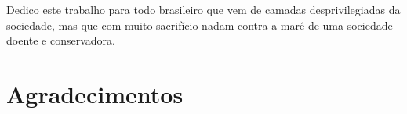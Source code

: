 %




\begin{dedicatoria}
Dedico este trabalho para todo brasileiro que vem de camadas desprivilegiadas da sociedade, mas que com muito sacrifício nadam contra a maré de uma sociedade doente e conservadora. 
\end{dedicatoria}

\hypersetup{pageanchor=true}


\chapter*{Agradecimentos}

